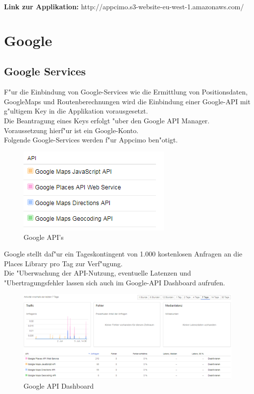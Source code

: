 \documentclass[a4paper, 11pt]{scrreprt}
\begin{document}
\textbf{Link zur Applikation: } http://appcimo.s3-website-eu-west-1.amazonaws.com/


\section{Google}

\subsection{Google Services}
F"ur die Einbindung von Google-Services wie die Ermittlung von Positionsdaten, GoogleMaps und Routenberechnungen wird die Einbindung einer Google-API mit g"ultigem Key in die Applikation vorausgesetzt. \\

Die Beantragung eines Keys erfolgt "uber den Google API Manager. Voraussetzung hierf"ur ist ein Google-Konto.\\

Folgende Google-Services werden f"ur Appcimo ben"otigt.

\begin{figure} [H]
\begin{center}
\includegraphics[scale=1]{google1.png}
\caption{Google API's}
\label{googleapi}
\end{center}
\end{figure}

Google stellt daf"ur ein Tageskontingent von 1.000 kostenlosen Anfragen an die Places Library pro Tag zur Verf"ugung.\\
Die "Uberwachung der API-Nutzung, eventuelle Latenzen und "Ubertragungsfehler lassen sich auch im Google-API Dashboard aufrufen.

\begin{figure} [H]
\begin{center}
\includegraphics[scale=1]{google2.png}
\caption{Google API Dashboard}
\label{googledashboard}
\end{center}
\end{figure}
\end{document}
